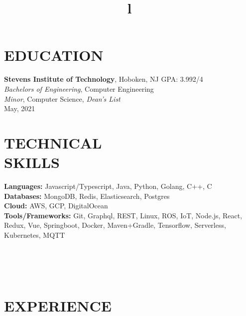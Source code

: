 \documentclass[margin]{res}
\begin{document}
\begin{resume}


\section{EDUCATION}
\textbf{Stevens Institute of Technology}, Hoboken, NJ \hfill GPA: 3.992/4\\
{\sl Bachelors of Engineering}, Computer Engineering\\
{\sl Minor}, Computer Science, {\sl Dean's List}\\
May, 2021

\section{TECHNICAL\\SKILLS}

\textbf{Languages:} Javascript/Typescript, Java, Python, Golang, C++, C
\\
\textbf{Databases:} MongoDB, Redis, Elasticsearch, Postgres
\\
\textbf{Cloud:} AWS, GCP, DigitalOcean
\\
\textbf{Tools/Frameworks:} Git, Graphql, REST, Linux, ROS, IoT, Node.js,
React, Redux, Vue, Springboot, Docker, Maven+Gradle, Tensorflow,
Serverless, Kubernetes, MQTT

\begin{format}
\title{l}\\
\\
\body\\
\end{format}

\section{EXPERIENCE}


\end{resume}
\end{document}
